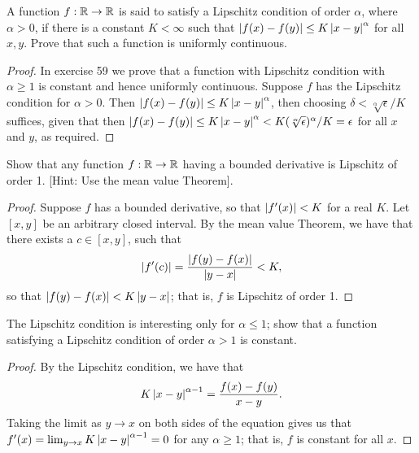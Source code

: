 \begin{exercise}{57}
A function $f:\mathbb{R} \to \mathbb{R}$ is said to satisfy a Lipschitz condition of order $\alpha$, where $\alpha>0$, if there is a constant $K<\infty$ such that $\left\lvert f(x)-f(y)\right\rvert\leq K\left\lvert x-y\right\rvert^\alpha$ for all $x,y$.
Prove that such a function is uniformly continuous.
\end{exercise}
\begin{proof}
In exercise 59 we prove that a function with Lipschitz condition with $\alpha\geq 1$ is constant and hence uniformly continuous.
Suppose $f$ has the Lipschitz condition for $\alpha>0$.
Then $\left\lvert f(x)-f(y)\right\rvert \leq K\left\lvert x-y\right\rvert^\alpha$, then choosing $\delta<\sqrt[\alpha]{\epsilon}/K$ suffices, given that then $\left\lvert f(x)-f(y)\right\rvert \leq K\left\lvert x-y\right\rvert^\alpha < K(\sqrt[\alpha]{\epsilon})^\alpha/K = \epsilon$ for all $x$ and $y$, as required.
\end{proof} 

\begin{exercise}{58}
Show that any function $f:\mathbb{R}\to\mathbb{R}$ having a bounded derivative is Lipschitz of order 1.
[Hint: Use the mean value Theorem].
\end{exercise}
\begin{proof}
Suppose $f$ has a bounded derivative, so that $\left\lvert f'(x)\right\rvert<K$ for a real $K$.
Let $[x,y]$ be an arbitrary closed interval.
By the mean value Theorem, we have that there exists a $c\in[x,y]$, such that 
\begin{align*}
    \left\lvert f'(c)\right\rvert 
    = \frac{\left\lvert f(y)-f(x)\right\rvert}
    {\left\lvert y-x\right\rvert} < K,
\end{align*}
so that $\left\lvert f(y)-f(x)\right\rvert<K\left\lvert y-x\right\rvert$; 
that is, $f$ is Lipschitz of order 1.
\end{proof} 

\begin{exercise}{59}
The Lipschitz condition is interesting only for $\alpha \leq 1$;
show that a function satisfying a Lipschitz condition of order $\alpha>1$ is constant.
\end{exercise}
\begin{proof}
By the Lipschitz condition, we have that
\begin{align*}
    K\left\lvert x-y\right\rvert^{\alpha-1} 
    = \frac{f(x)-f(y)}{x-y}.
\end{align*}
Taking the limit as $y\to x$ on both sides of the equation gives us that $f'(x)=\lim_{y\to x}K\left\lvert x-y\right\rvert^{\alpha-1}=0$ for any $\alpha\geq 1$;
that is, $f$ is constant for all $x$.
\end{proof} 


